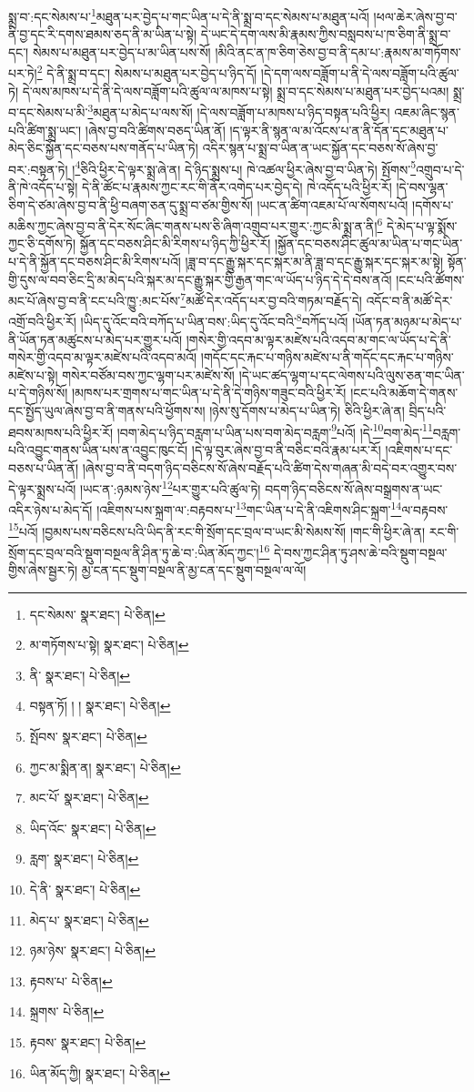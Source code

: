 སྨྲ་བ་:དང་སེམས་པ་\footnote{དང་སེམས་  སྣར་ཐང་།  པེ་ཅིན། }མཐུན་པར་བྱེད་པ་གང་ཡིན་པ་དེ་ནི་སྨྲ་བ་དང་སེམས་པ་མཐུན་པའོ། །ཕལ་ཆེར་ཞེས་བྱ་བ་ནི་བྱ་དང་རི་དགས་ཐམས་ཅད་ནི་མ་ཡིན་པ་སྟེ། དེ་ཡང་དེ་དག་ལས་མི་རྣམས་ཀྱིས་བསླབས་པ་ཁ་ཅིག་ནི་སྨྲ་བ་དང་། སེམས་པ་མཐུན་པར་བྱེད་པ་མ་ཡིན་པས་སོ། །མིའི་ནང་ན་ཁ་ཅིག་ཅེས་བྱ་བ་ནི་དམ་པ་:རྣམས་མ་གཏོགས་པར་ཏེ།\footnote{མ་གཏོགས་པ་སྟེ།  སྣར་ཐང་།  པེ་ཅིན། } དེ་ནི་སྨྲ་བ་དང་། སེམས་པ་མཐུན་པར་བྱེད་པ་ཉིད་དོ། །དེ་དག་ལས་བཟློག་པ་ནི་དེ་ལས་བཟློག་པའི་ཚུལ་ཏེ། དེ་ལས་མཁས་པ་དེ་ནི་དེ་ལས་བཟློག་པའི་ཚུལ་ལ་མཁས་པ་སྟེ། སྨྲ་བ་དང་སེམས་པ་མཐུན་པར་བྱེད་པའམ། སྨྲ་བ་དང་སེམས་པ་མི་\footnote{ནི་  སྣར་ཐང་།  པེ་ཅིན། }མཐུན་པ་མེད་པ་ལས་སོ། །དེ་ལས་བཟློག་པ་མཁས་པ་ཉིད་བསྟན་པའི་ཕྱིར། འཇམ་ཞིང་སྙན་པའི་ཚིག་སྨྲ་ཡང་། །ཞེས་བྱ་བའི་ཚིགས་བཅད་ཡིན་ནོ། །ད་ལྟར་ནི་སྙན་ལ་མ་འོངས་པ་ན་ནི་དོན་དང་མཐུན་པ་མེད་ཅིང་སྐྱོན་དང་བཅས་པས་གནོད་པ་ཡིན་ཏེ། འདིར་སྙན་པ་སྨྲ་བ་ཡིན་ན་ཡང་སྐྱོན་དང་བཅས་སོ་ཞེས་བྱ་བར་:བསྟན་ཏེ། །\footnote{བསྟན་ཏོ། ། །  སྣར་ཐང་།  པེ་ཅིན། }ཅིའི་ཕྱིར་དེ་ལྟར་སྨྲ་ཞེ་ན། དེ་ཉིད་སྨྲས་པ། ཁེ་འཚལ་ཕྱིར་ཞེས་བྱ་བ་ཡིན་ཏེ། སྤོགས་\footnote{སྤོབས་  སྣར་ཐང་།  པེ་ཅིན། }འགྲུབ་པ་དེ་ནི་ཁེ་འདོད་པ་སྟེ། དེ་ནི་ཚོང་པ་རྣམས་ཀྱང་རང་གི་ནོར་འགེད་པར་བྱེད་དེ། ཁེ་འདོད་པའི་ཕྱིར་རོ། །དེ་བས་ལྷན་ཅིག་དེ་ཙམ་ཞེས་བྱ་བ་ནི་ཕྱི་བཞག་ཅན་དུ་སྨྲ་བ་ཙམ་གྱིས་སོ། །ཡང་ན་ཚིག་འཇམ་པོ་ལ་སོགས་པའོ། །དགོས་པ་མཆིས་ཀྱང་ཞེས་བྱ་བ་ནི་དེར་སོང་ཞིང་གནས་པས་ཅི་ཞིག་འགྲུབ་པར་གྱུར་:ཀྱང་མི་སྨྲ་ན་ནི།\footnote{ཀྱང་མ་སྨིན་ན།  སྣར་ཐང་།  པེ་ཅིན། } དེ་མེད་པ་ལྟ་སྨོས་ཀྱང་ཅི་དགོས་ཏེ། སྐྱོན་དང་བཅས་ཤིང་མི་རིགས་པ་ཉིད་ཀྱི་ཕྱིར་རོ། །སྐྱོན་དང་བཅས་ཤིང་ཚུལ་མ་ཡིན་པ་གང་ཡིན་པ་དེ་ནི་སྐྱོན་དང་བཅས་ཤིང་མི་རིགས་པའོ། །ཟླ་བ་དང་རྒྱུ་སྐར་དང་སྐར་མ་ནི་ཟླ་བ་དང་རྒྱུ་སྐར་དང་སྐར་མ་སྟེ། སྟོན་གྱི་དུས་ལ་བབ་ཅིང་དྲི་མ་མེད་པའི་སྐར་མ་དང་རྒྱུ་སྐར་གྱི་རྒྱན་གང་ལ་ཡོད་པ་ཉིད་དེ་དེ་བས་ནའོ། །ངང་པའི་ཚོགས་མང་པོ་ཞེས་བྱ་བ་ནི་ངང་པའི་ཁྱུ་:མང་པོས་\footnote{མང་པོ་  སྣར་ཐང་།  པེ་ཅིན། }མཚོ་དེར་འདོད་པར་བྱ་བའི་གཏམ་བརྗོད་དེ། འདོང་བ་ནི་མཚོ་དེར་འགྲོ་བའི་ཕྱིར་རོ། །ཡིད་དུ་འོང་བའི་བཀོད་པ་ཡིན་བས་:ཡིད་དུ་འོང་བའི་\footnote{ཡིད་འོང་  སྣར་ཐང་།  པེ་ཅིན། }བཀོད་པའོ། །ཡོན་ཏན་མཉམ་པ་མེད་པ་ནི་ཡོན་ཏན་མཚུངས་པ་མེད་པར་གྱུར་པའོ། །གསེར་གྱི་འདབ་མ་ལྟར་མཛེས་པའི་འདབ་མ་གང་ལ་ཡོད་པ་དེ་ནི་གསེར་གྱི་འདབ་མ་ལྟར་མཛེས་པའི་འདབ་མའོ། །གདོང་དང་རྐང་པ་གཉིས་མཛེས་པ་ནི་གདོང་དང་རྐང་པ་གཉིས་མཛེས་པ་སྟེ། གསེར་བཙོམ་བས་ཀྱང་ལྷག་པར་མཛེས་སོ། །དེ་ཡང་ཚད་ལྷག་པ་དང་ལེགས་པའི་ལུས་ཅན་གང་ཡིན་པ་དེ་གཉིས་སོ། །མཁས་པར་གྲགས་པ་གང་ཡིན་པ་དེ་ནི་དེ་གཉིས་གཟུང་བའི་ཕྱིར་རོ། །ངང་པའི་མཆོག་དེ་གནས་དང་སྤྱོད་ཡུལ་ཞེས་བྱ་བ་ནི་གནས་པའི་ཕྱོགས་ས། །ཉེས་སུ་དོགས་པ་མེད་པ་ཡིན་ཏེ། ཅིའི་ཕྱིར་ཞེ་ན། བྲིད་པའི་ཐབས་མཁས་པའི་ཕྱིར་རོ། །བག་མེད་པ་ཉིད་བརླག་པ་ཡིན་པས་བག་མེད་བརླག་\footnote{རླག་  སྣར་ཐང་།  པེ་ཅིན། }པའོ། །དེ་\footnote{དེ་ནི་  སྣར་ཐང་།  པེ་ཅིན། }བག་མེད་\footnote{མེད་པ་  སྣར་ཐང་།  པེ་ཅིན། }བརླག་པའི་འབྱུང་གནས་ཡིན་པས་ན་འབྱུང་ཁུང་ངོ། །དེ་ལྟ་བུར་ཞེས་བྱ་བ་ནི་བཅིང་བའི་རྣམ་པར་རོ། །འཇིགས་པ་དང་བཅས་པ་ཡིན་ནོ། །ཞེས་བྱ་བ་ནི་བདག་ཉིད་བཅིངས་སོ་ཞེས་བརྗོད་པའི་ཚིག་དེས་གཞན་མི་བདེ་བར་འགྱུར་བས་དེ་ལྟར་སྨྲས་པའོ། །ཡང་ན་:ཉམས་ཉེས་\footnote{ཉམ་ཉེས་  སྣར་ཐང་།  པེ་ཅིན། }པར་གྱུར་པའི་ཚུལ་ཏེ། བདག་ཉིད་བཅིངས་སོ་ཞེས་བསྒྲགས་ན་ཡང་འདིར་ཉེས་པ་མེད་དོ། །འཇིགས་པས་སྐྲག་ལ་:བརྟབས་པ་\footnote{རྟབས་པ་  པེ་ཅིན། }གང་ཡིན་པ་དེ་ནི་འཇིགས་ཤིང་སྐྲག་\footnote{སྐྲགས་  པེ་ཅིན། }ལ་བརྟབས་\footnote{རྟབས་  སྣར་ཐང་།  པེ་ཅིན། }པའོ། །བྱམས་པས་བཅིངས་པའི་ཡིད་ནི་རང་གི་སྲོག་དང་བྲལ་བ་ཡང་མི་སེམས་སོ། །གང་གི་ཕྱིར་ཞེ་ན། རང་གི་སྲོག་དང་བྲལ་བའི་སྡུག་བསྔལ་ནི་ཤིན་ཏུ་ཆེ་བ་:ཡིན་མོད་ཀྱང་།\footnote{ཡིན་མོད་ཀྱི།  སྣར་ཐང་།  པེ་ཅིན། } དེ་བས་ཀྱང་ཤིན་ཏུ་ཤས་ཆེ་བའི་སྡུག་བསྔལ་གྱིས་ཞེས་སྦྱར་ཏེ། མྱ་ངན་དང་སྡུག་བསྔལ་ནི་མྱ་ངན་དང་སྡུག་བསྔལ་ལ་ལོ། 
